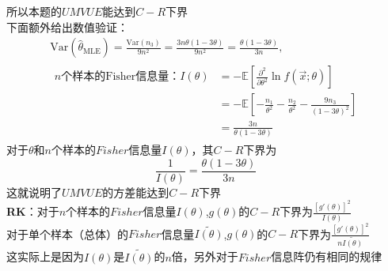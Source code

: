 \documentclass[12pt]{article}
\begin{document}
所以本题的$UMVUE$能达到$C-R$下界\\
下面额外给出数值验证：\\
\begin{gather}
\text{Var}(\hat{\theta}_{\text{MLE}}) = \frac{\text{Var}(n_3)}{9n^2} = \frac{3n\theta(1-3\theta)}{9n^2} = \frac{\theta(1-3\theta)}{3n}, \\
\begin{aligned}
	n \text{个样本的Fisher信息量：} I(\theta) &= -\mathbb{E}\left[ \frac{\partial^2}{\partial\theta^2} \ln f(\vec{x};\theta) \right]\\
	&=-\mathbb{E}[-\frac{n_1}{\theta^2}-\frac{n_2}{\theta^2}-\frac{9n_3}{(1-3\theta)^2}]\\
	&=\frac{3n}{\theta(1-3\theta)}
\end{aligned}
\end{gather}
对于$\theta$和$n$个样本的$Fisher$信息量$I(\theta)$，其$C-R$下界为$$\frac{1}{I(\theta)}=\frac{\theta(1-3\theta)}{3n}$$这就说明了$UMVUE$的方差能达到$C-R$下界\\
\textbf{RK}：对于$n$个样本的$Fisher$信息量$I(\theta)$,$g(\theta)$的$C-R$下界为$\frac{[g'(\theta)]^2}{I(\theta)}$\\
对于单个样本（总体）的$Fisher$信息量$\widetilde{I(\theta)}$,$g(\theta)$的$C-R$下界为$\frac{[g'(\theta)]^2}{n\widetilde{I(\theta)}}$\\
这实际上是因为$I(\theta)$是$\widetilde{I(\theta)}$的$n$倍，另外对于$Fisher$信息阵仍有相同的规律\\
\end{document}
